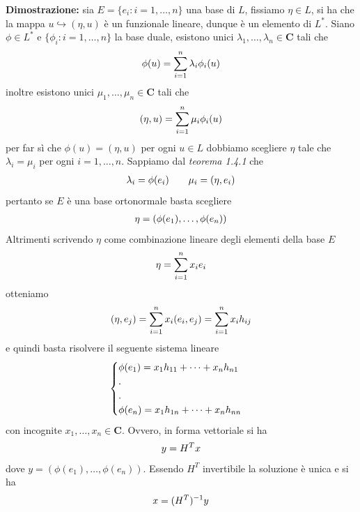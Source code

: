 \documentclass{article}
\begin{document}
\textbf{Dimostrazione:} sia $E = \{e_i : i = 1, \dots, n\}$ una base di $L$, fissiamo $\eta \in L$, si ha che la mappa $u \hookrightarrow (\eta, u)$ è un funzionale lineare, dunque è un elemento di $L^*$. Siano $\phi \in L^*$ e $\{\phi_i : i = 1, \dots, n\}$ la base duale, esistono unici $\lambda_1, \dots, \lambda_n \in \mathbf{C}$ tali che
\begin{gather}
    \phi(u) = \sum_{i = 1}^n \lambda_i\phi_i(u) \notag
\end{gather}
inoltre esistono unici $\mu_1, \dots, \mu_n \in \mathbf{C}$ tali che
\begin{gather}
    (\eta, u) = \sum_{i = 1}^n \mu_i\phi_i(u) \notag
\end{gather}
per far sì che $\phi(u) = (\eta, u)$ per ogni $u \in L$ dobbiamo scegliere $\eta$ tale che $\lambda_i = \mu_i$ per ogni $i = 1, \dots, n$. Sappiamo dal \textit{teorema 1.4.1} che
\begin{gather}
    \lambda_i = \phi(e_i) \qquad \mu_i = (\eta, e_i) \notag
\end{gather}
pertanto se $E$ è una base ortonormale basta scegliere
\begin{gather}
    \eta = (\phi(e_1), \dots, \phi(e_n)) \notag
\end{gather}
Altrimenti scrivendo $\eta$ come combinazione lineare degli elementi della base $E$
\begin{gather}
    \eta = \sum_{i = 1}^n x_ie_i \notag
\end{gather}
otteniamo
\begin{gather}
    (\eta, e_j) = \sum_{i = 1}^n x_i(e_i, e_j) = \sum_{i = 1}^n x_ih_{ij} \notag
\end{gather}
e quindi basta risolvere il seguente sistema lineare
\begin{gather}
    \begin{cases}
        \phi(e_1) = x_1h_{11} + \dots + x_nh_{n1} \\
        . \\
        . \\
        \phi(e_n) = x_1h_{1n} + \dots + x_nh_{nn}
    \end{cases} \notag
\end{gather}
con incognite $x_1, \dots, x_n \in \mathbf{C}$. Ovvero, in forma vettoriale si ha
\begin{gather}
    y = H^Tx \notag
\end{gather}
dove $y = (\phi(e_1), \dots, \phi(e_n))$. Essendo $H^T$ invertibile la soluzione è unica e si ha
\begin{gather}
    x = (H^T)^{-1}y \notag
\end{gather}
\end{document}
